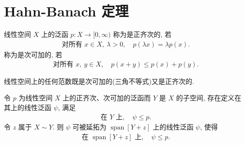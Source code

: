 \documentclass[../../main.tex]{subfiles}
\begin{document}
\section{Hahn-Banach 定理}\label{section:ch14-Hahn-Banach}

\begin{definition}\label{definition:ch14-正齐次次可加}
线性空间 $X$ 上的泛函 $p:X\to[0,\infty)$ 称为是正齐次的, 若
\begin{align*}
\text{对所有 }x\in X,\ \lambda>0,\quad p(\lambda x)=\lambda p(x).
\end{align*}
称为是次可加的, 若
\begin{align*}
\text{对所有 }x,\ y\in X,\quad p(x+y)\leqslant p(x)+p(y).
\end{align*}
\end{definition}

线性空间上的任何范数既是次可加的(三角不等式)又是正齐次的.

\begin{lemma}\label{lemma:ch14-HB引理}
令 $p$ 为线性空间 $X$ 上的正齐次、次可加的泛函而 $Y$ 是 $X$ 的子空间, 存在定义在其上的线性泛函 $\psi$, 满足
\begin{align*}
\text{在 }Y\text{ 上},\quad\psi\leqslant p.
\end{align*}
令 $z$ 属于 $X\sim Y$. 则 $\psi$ 可被延拓为 $\operatorname{span}[Y+z]$ 上的线性泛函 $\psi$, 使得
\begin{align*}
\text{在 }\operatorname{span}[Y+z]\text{ 上},\quad\psi\leqslant p.
\end{align*}
\end{lemma}
\end{document}
